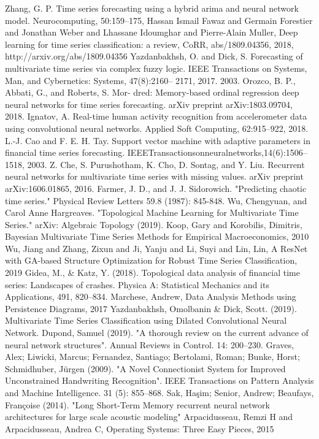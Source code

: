\documentclass[12pt]{ctexart}
\begin{document}
\begin{thebibliography}{99}
Zhang, G. P. Time series forecasting using a hybrid arima and neural network model. Neurocomputing, 50:159–175,
Hassan Ismail Fawaz and
               Germain Forestier and
               Jonathan Weber and
               Lhassane Idoumghar and
               Pierre{-}Alain Muller, Deep learning for time series classification: a review, CoRR, abs/1809.04356, 2018, http://arxiv.org/abs/1809.04356
Yazdanbakhsh, O. and Dick, S. Forecasting of multivariate
time series via complex fuzzy logic. IEEE Transactions
on Systems, Man, and Cybernetics: Systems, 47(8):2160–
2171, 2017.
2003.
Orozco, B. P., Abbati, G., and Roberts, S. Mor-
dred: Memory-based ordinal regression deep neural
networks for time series forecasting. arXiv preprint
arXiv:1803.09704, 2018.
Ignatov, A. Real-time human activity recognition from
accelerometer data using convolutional neural networks.
Applied Soft Computing, 62:915–922, 2018.
L.-J. Cao and F. E. H. Tay. Support vector machine with adaptive parameters in
financial time series forecasting. IEEETransactionsonneuralnetworks,14(6):1506–
1518, 2003.
Z. Che, S. Purushotham, K. Cho, D. Sontag, and Y. Liu. Recurrent neural networks
for multivariate time series with missing values. arXiv preprint arXiv:1606.01865,
2016.
Farmer, J. D., and J. J. Sidorowich. "Predicting chaotic time series." Physical Review Letters 59.8 (1987): 845-848.
Wu, Chengyuan, and Carol Anne Hargreaves. "Topological Machine Learning for Multivariate Time Series." arXiv: Algebraic Topology (2019).
Koop, Gary and Korobilis, Dimitris, Bayesian Multivariate Time Series Methods for Empirical Macroeconomics, 2010
Wu, Jiang and Zhang, Zixun and Ji, Yanju and Li, Suyi and Lin, Lin, A ResNet with GA-based Structure Optimization for Robust Time Series Classification, 2019
Gidea, M., \& Katz, Y. (2018). Topological data analysis of financial time series: Landscapes
of crashes. Physica A: Statistical Mechanics and its Applications, 491, 820–834.
Marchese, Andrew, Data Analysis Methods using Persistence Diagrams, 2017
Yazdanbakhsh, Omolbanin \& Dick, Scott. (2019). Multivariate Time Series Classification using Dilated Convolutional Neural Network. 
Dupond, Samuel (2019). "A thorough review on the current advance of neural network structures". Annual Reviews in Control. 14: 200–230.
Graves, Alex; Liwicki, Marcus; Fernandez, Santiago; Bertolami, Roman; Bunke, Horst; Schmidhuber, Jürgen (2009). "A Novel Connectionist System for Improved Unconstrained Handwriting Recognition". IEEE Transactions on Pattern Analysis and Machine Intelligence. 31 (5): 855–868. 
Sak, Haşim; Senior, Andrew; Beaufays, Françoise (2014). "Long Short-Term Memory recurrent neural network architectures for large scale acoustic modeling"
Arpacidusseau, Remzi H and Arpacidusseau, Andrea C, Operating Systems: Three Easy Pieces, 2015
\end{thebibliography}
\end{document}
